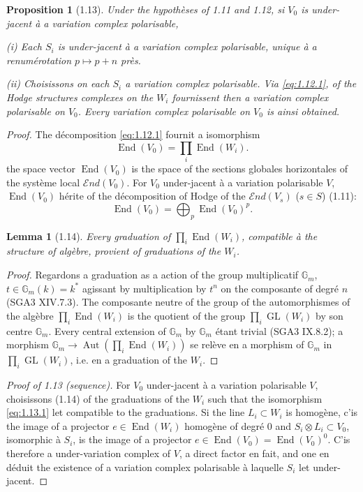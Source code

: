 \documentclass[12pt,a4paper]{article}
\theoremstyle{plain}
\newtheorem{lemma}{Lemma}[section]
\newtheorem{proposition}{Proposition}[section]
\theoremstyle{definition}
\DeclareMathOperator{\End}{End}
\DeclareMathOperator{\Aut}{Aut}
\DeclareMathOperator{\GL}{GL}
\begin{document}
{\begin{proposition}[1.13]
Under the hypoth\`{e}ses of 1.11 and 1.12, si $V_{0}$ is under-jacent \`{a} a variation complex polarisable,

\textup{(i)} Each $S_{i}$ is under-jacent \`{a} a variation complex polarisable, unique \`{a} a renum\'{e}rotation $p \mapsto p + n$ pr\`{e}s.

\textup{(ii)} Choisissons on each $S_{i}$ a variation complex polarisable. Via \eqref{eq:1.12.1}, of the Hodge structures complexes on the $W_{i}$ fournissent then a variation complex polarisable on $V_{0}$. Every variation complex polarisable on $V_{0}$ is ainsi obtained.
\end{proposition}

\begin{proof}
The d\'{e}composition \eqref{eq:1.12.1} fournit a isomorphism
\begin{equation}\label{eq:1.13.1}
\End(V_{0}) = \prod_{i} \End(W_{i}).
\end{equation}
the space vector $\End(V_{0})$ is the space of the sections globales horizontales of the syst\`{e}me local $\mathcal{E}nd(V_{0})$. For $V_{0}$ under-jacent \`{a} a variation polarisable $V$, $\End(V_{0})$ h\'{e}rite of the d\'{e}composition of Hodge of the $\mathcal{E}nd(V_{s})$ ($s \in S$) (1.11):
\[
\End(V_{0}) = \bigoplus_{p} \End(V_{0})^{p}.
\]

\begin{lemma}[1.14]
Every graduation of $\prod_{i} \End(W_{i})$, compatible \`{a} the structure of alg\`{e}bre, provient of graduations of the $W_{i}$.
\end{lemma}

\begin{proof}
Regardons a graduation as a action of the group multiplicatif $\mathbb{G}_{m}$, $t \in \mathbb{G}_{m}(k) = k^{*}$ agissant by multiplication by $t^{n}$ on the composante of degr\'{e} $n$ (SGA3 XIV.7.3). The composante neutre of the group of the automorphismes of the alg\`{e}bre $\prod_{i} \End(W_{i})$ is the quotient of the group $\prod_{i} \GL(W_{i})$ by son centre $\mathbb{G}_{m}$. Every central extension of $\mathbb{G}_{m}$ by $\mathbb{G}_{m}$ \'{e}tant trivial (SGA3 IX.8.2); a morphism $\mathbb{G}_{m} \to \Aut(\prod_{i} \End(W_{i}))$ se rel\`{e}ve en a morphism of $\mathbb{G}_{m}$ in $\prod_{i} \GL(W_{i})$, i.e. en a graduation of the $W_{i}$.
\end{proof}

\textit{Proof of 1.13 (sequence).} For $V_{0}$ under-jacent \`{a} a variation polarisable $V$, choisissons (1.14) of the graduations of the $W_{i}$ such that the isomorphism \eqref{eq:1.13.1} let compatible to the graduations. Si the line $L_{i} \subset W_{i}$ is homog\`{e}ne, c'is the image of a projector $e \in \End(W_{i})$ homog\`{e}ne of degr\'{e} $0$ and $S_{i} \otimes L_{i} \subset V_{0}$, isomorphic \`{a} $S_{i}$, is the image of a projector $e \in \End(V_{0}) = \End(V_{0})^{0}$. C'is therefore a under-variation complex of $V$, a direct factor en fait, and one en d\'{e}duit the existence of a variation complex polarisable \`{a} laquelle $S_{i}$ let under-jacent.


\end{proof}}
\end{document}
